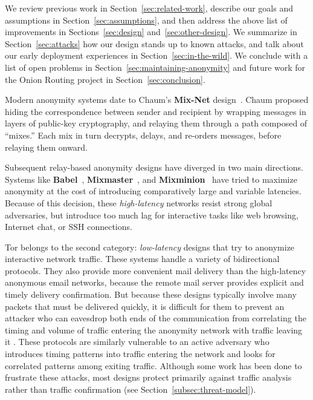 \documentclass[times,10pt,twocolumn]{article}
\begin{document}
We review previous work in Section~\ref{sec:related-work}, describe
our goals and assumptions in Section~\ref{sec:assumptions},
and then address the above list of improvements in
Sections~\ref{sec:design} and~\ref{sec:other-design}. We summarize
in Section~\ref{sec:attacks} how our design stands up to
known attacks, and talk about our early deployment experiences in
Section~\ref{sec:in-the-wild}. We conclude with a list of open problems in
Section~\ref{sec:maintaining-anonymity} and future work for the Onion
Routing project in Section~\ref{sec:conclusion}.


\label{sec:related-work}

Modern anonymity systems date to Chaum's {\bf Mix-Net}
design~\cite{chaum-mix}. Chaum
proposed hiding the correspondence between sender and recipient by
wrapping messages in layers of public-key cryptography, and relaying them
through a path composed of ``mixes.''  Each mix in turn
decrypts, delays, and re-orders messages, before relaying them 
onward.

Subsequent relay-based anonymity designs have diverged in two
main directions. Systems like {\bf Babel}~\cite{babel},
{\bf Mixmaster}~\cite{mixmaster-spec},
and {\bf Mixminion}~\cite{minion-design} have tried
to maximize anonymity at the cost of introducing comparatively large and
variable latencies. Because of this decision, these \emph{high-latency}
networks resist strong global adversaries,
but introduce too much lag for interactive tasks like web browsing,
Internet chat, or SSH connections.

Tor belongs to the second category: \emph{low-latency} designs that
try to anonymize interactive network traffic. These systems handle
a variety of bidirectional protocols. They also provide more convenient
mail delivery than the high-latency anonymous email
networks, because the remote mail server provides explicit and timely
delivery confirmation. But because these designs typically
involve many packets that must be delivered quickly, it is
difficult for them to prevent an attacker who can eavesdrop both ends of the
communication from correlating the timing and volume
of traffic entering the anonymity network with traffic leaving it \cite{SS03}.
These
protocols are similarly vulnerable to an active adversary who introduces
timing patterns into traffic entering the network and looks
for correlated patterns among exiting traffic.
Although some work has been done to frustrate
these attacks, %
 most designs protect primarily against traffic analysis rather than traffic
confirmation (see Section~\ref{subsec:threat-model}).
\end{document}
